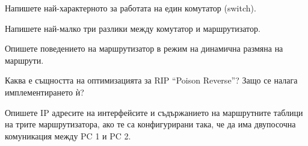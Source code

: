 \begin{questions}
  \question Напишете най-характерното за работата на един комутатор
  (\foreignlanguage{english}{switch}).

  \question Напишете най-малко три разлики между комутатор и маршрутизатор.

  \question Опишете поведението на маршрутизатор в режим на динамична размяна на
  маршрути.

  \question Каква е същността на оптимизацията за RIP "`Poison Reverse"'? Защо
  се налага имплементирането ѝ?

  \question Опишете IP адресите на интерфейсите и съдържанието на маршрутните
  таблици на трите маршрутизатора, ако те са конфигурирани така, че да има
  двупосочна комуникация между PC 1 и PC 2.

  \begin{center}
\end{center}
\end{questions}
